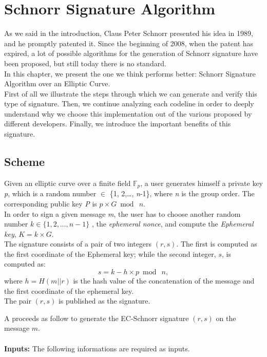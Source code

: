 \chapter{Schnorr Signature Algorithm}
\label{capitolo3}
\thispagestyle{empty}

As we said in the introduction, Claus Peter Schnorr presented his idea in 1989, and he promptly patented it. Since the beginning of 2008, when the patent has expired, a lot of possible algorithms for the generation of Schnorr signature have been proposed, but still today there is no standard.\\
In this chapter, we present the one we think performs better: Schnorr Signature Algorithm over an Elliptic Curve.\\
First of all we illustrate the steps through which we can generate and verify this type of signature.
Then, we continue analyzing each codeline in order to deeply understand why we choose this implementation out of the various proposed by different developers.
Finally, we introduce the important benefits of this signature.



\section{Scheme}
Given an elliptic curve over a finite field $\mathbb{F} _{p}$, a user generates himself a private key \textit{p}, which is a random number $\in$ \{1, 2,\dots, \textit{n}-1\}, where \textit{n} is the group order. The corresponding public key \textit{P} is $\textit{p}\times G\bmod\ n$. \\
In order to sign a given message \textit{m}, the user has to choose another random number $k\in \{1, 2, \dots, \textit{n}-1\}$
, the \textit{ephemeral nonce}, and compute the \textit{Ephemeral key}, $\textit{K}= k \times G$.
\\
The signature consists of a pair of two integers $(r, s)$. The first is computed as the first coordinate of the Ephemeral
key; while the second integer, $s$, is 
computed as: 
\begin{equation}
\label{eqn:s}
s=k - h \times p\bmod\ n,
\end{equation}
where $h=H(m||r)$ is the hash value of the concatenation of the message and the first coordinate of the ephemeral key. \\
The pair $(r,s)$ is published as the signature.

A proceeds as follow to generate the EC-Schnorr signature $(r, s)$ on the message $m$.\\
\\
\textbf{Inputs:} The following informations are required as inputs.

